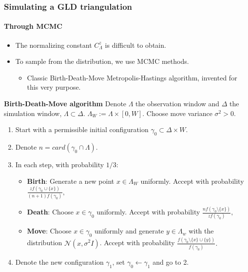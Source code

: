 \documentclass[c, 10pt]{beamer}
\begin{document}
\begin{frame}\frametitle{Simulating a GLD triangulation}\framesubtitle{Through MCMC}

\begin{small}
\begin{itemize}
    \item The normalizing constant $C^{z}_\Lambda$ is difficult to obtain.
    \item To sample from the distribution, we use MCMC methods.
    \begin{itemize}
        \item Classic Birth-Death-Move Metropolis-Hastings algorithm, invented for this very purpose.
    \end{itemize} 
\end{itemize}


\pause
\textbf{Birth-Death-Move algorithm}\newline
Denote $\Lambda$ the observation window and $\Delta$ the simulation window, $\Lambda \subset \Delta$. $\Lambda_W := \Lambda \times [0,W]$. Choose move variance $\sigma^2>0$.
\begin{enumerate}
    \item Start with a permissible initial configuration $\gamma_0 \subset \Delta \times W$. 
    \item Denote $n=card(\gamma_0\cap \Lambda)$.
    \item In each step, with probability $1/3$:
    \begin{itemize}
        \item \textbf{Birth}: Generate a new point $x \in \Lambda_W$ uniformly. Accept with probability  $ \frac{z f(\gamma_0 \cup \{x\})}{(n+1)f(\gamma_0)},$
        \item \textbf{Death}: Choose $x\in\gamma_0$ uniformly. Accept with probability $ \frac{n f(\gamma_0 \setminus \{x\})}{zf(\gamma_0)},$
        \item \textbf{Move}: Choose $x\in\gamma_0$ uniformly and generate $y \in \Lambda_w$ with the distribution $\mathcal N(x, \sigma^2 I)$. Accept with probability $ \frac{f(\gamma_0 \setminus \{x\} \cup \{y\})}{f(\gamma_0)}.$
    \end{itemize}
    \item Denote the new configuration $\gamma_1$, set $\gamma_0 \leftarrow \gamma_1$ and go to 2.

\end{enumerate}

\end{small}
\end{frame}
 
\end{document}
